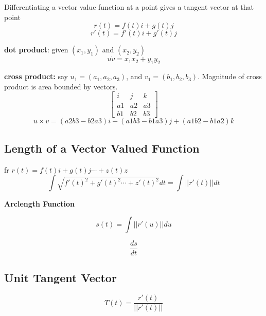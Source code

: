 Differentiating a vector value function at a point gives a tangent vector at that point
\begin{equation}
	\label{}
r(t)=f(t)i+g(t)j	
\end{equation}
\begin{equation}
	\label{}
r'(t)=f'(t)i+g'(t)j	
\end{equation}

\textbf{dot product}: given $(x_{1},y_{1})$ and $(x_{2},y_{2})$
\begin{equation}
	\label{}
u\dot v = x_{1}x_{2}+y_{1}y_{2}
\end{equation}	

\textbf{cross product:} say $u_{1}=(a_{1},a_{2},a_{3})$, and $v_{1}=(b_{1},b_{2},b_{3})$. Magnitude of cross product is area bounded by vectors.
\begin{equation}
	\label{}
\begin{bmatrix}
	i&j&k\\
	a1&a2&a3\\
	b1&b2&b3
\end{bmatrix}	
\end{equation}
\begin{equation}
	\label{}
	u \times  v=(a2b3-b2a3)i - (a1b3-b1a3)j + (a1b2-b1a2)k
\end{equation}



\subsection{Length of a Vector Valued Function}
fr $r(t)=f(t)i+g(t)j\cdots +z(t)z$
\begin{equation}
	\label{}
	\int\sqrt{f'(t)^{2}+g'(t)^{2}\cdots +z'(t)^{2}}dt=\int ||r'(t)||dt
\end{equation}

\textbf{Arclength Function}


\begin{equation}
	\label{}	
s(t)=\int ||r'(u)||du
\end{equation}

\begin{equation}
	\label{}	
\frac{ds}{dt}
\end{equation}


\subsection{Unit Tangent Vector}
\begin{equation}
	\label{}
T(t)=\frac{r'(t)}{||r'(t)||}	
\end{equation}



